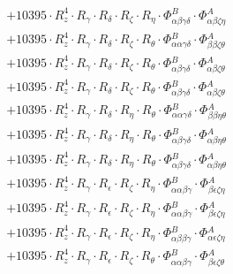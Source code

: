 \documentclass{article}
\begin{document}
\begin{subequations}
\begin{gather}
\begin{array}{c}
 \\[0.2em] 		 + 10395 \cdot R_{z}^{4} \cdot R_{\gamma{}} \cdot R_{\delta{}} \cdot R_{\zeta{}} \cdot R_{\eta{}} \cdot \Phi{}^{B}_{\alpha{}\beta{}\gamma{}\delta{}} \cdot \Phi{}^{A}_{\alpha{}\beta{}\zeta{}\eta{}} 
 \\[0.2em] 		 + 10395 \cdot R_{z}^{4} \cdot R_{\gamma{}} \cdot R_{\delta{}} \cdot R_{\zeta{}} \cdot R_{\theta{}} \cdot \Phi{}^{B}_{\alpha{}\alpha{}\gamma{}\delta{}} \cdot \Phi{}^{A}_{\beta{}\beta{}\zeta{}\theta{}} 
 \\[0.2em] 		 + 10395 \cdot R_{z}^{4} \cdot R_{\gamma{}} \cdot R_{\delta{}} \cdot R_{\zeta{}} \cdot R_{\theta{}} \cdot \Phi{}^{B}_{\alpha{}\beta{}\gamma{}\delta{}} \cdot \Phi{}^{A}_{\alpha{}\beta{}\zeta{}\theta{}} 
 \\[0.2em] 		 + 10395 \cdot R_{z}^{4} \cdot R_{\gamma{}} \cdot R_{\delta{}} \cdot R_{\zeta{}} \cdot R_{\theta{}} \cdot \Phi{}^{B}_{\alpha{}\beta{}\gamma{}\delta{}} \cdot \Phi{}^{A}_{\alpha{}\beta{}\zeta{}\theta{}} 
 \\[0.2em] 		 + 10395 \cdot R_{z}^{4} \cdot R_{\gamma{}} \cdot R_{\delta{}} \cdot R_{\eta{}} \cdot R_{\theta{}} \cdot \Phi{}^{B}_{\alpha{}\alpha{}\gamma{}\delta{}} \cdot \Phi{}^{A}_{\beta{}\beta{}\eta{}\theta{}} 
 \\[0.2em] 		 + 10395 \cdot R_{z}^{4} \cdot R_{\gamma{}} \cdot R_{\delta{}} \cdot R_{\eta{}} \cdot R_{\theta{}} \cdot \Phi{}^{B}_{\alpha{}\beta{}\gamma{}\delta{}} \cdot \Phi{}^{A}_{\alpha{}\beta{}\eta{}\theta{}} 
 \\[0.2em] 		 + 10395 \cdot R_{z}^{4} \cdot R_{\gamma{}} \cdot R_{\delta{}} \cdot R_{\eta{}} \cdot R_{\theta{}} \cdot \Phi{}^{B}_{\alpha{}\beta{}\gamma{}\delta{}} \cdot \Phi{}^{A}_{\alpha{}\beta{}\eta{}\theta{}} 
 \\[0.2em] 		 + 10395 \cdot R_{z}^{4} \cdot R_{\gamma{}} \cdot R_{\epsilon{}} \cdot R_{\zeta{}} \cdot R_{\eta{}} \cdot \Phi{}^{B}_{\alpha{}\alpha{}\beta{}\gamma{}} \cdot \Phi{}^{A}_{\beta{}\epsilon{}\zeta{}\eta{}} 
 \\[0.2em] 		 + 10395 \cdot R_{z}^{4} \cdot R_{\gamma{}} \cdot R_{\epsilon{}} \cdot R_{\zeta{}} \cdot R_{\eta{}} \cdot \Phi{}^{B}_{\alpha{}\alpha{}\beta{}\gamma{}} \cdot \Phi{}^{A}_{\beta{}\epsilon{}\zeta{}\eta{}} 
 \\[0.2em] 		 + 10395 \cdot R_{z}^{4} \cdot R_{\gamma{}} \cdot R_{\epsilon{}} \cdot R_{\zeta{}} \cdot R_{\eta{}} \cdot \Phi{}^{B}_{\alpha{}\beta{}\beta{}\gamma{}} \cdot \Phi{}^{A}_{\alpha{}\epsilon{}\zeta{}\eta{}} 
 \\[0.2em] 		 + 10395 \cdot R_{z}^{4} \cdot R_{\gamma{}} \cdot R_{\epsilon{}} \cdot R_{\zeta{}} \cdot R_{\theta{}} \cdot \Phi{}^{B}_{\alpha{}\alpha{}\beta{}\gamma{}} \cdot \Phi{}^{A}_{\beta{}\epsilon{}\zeta{}\theta{}} 

\end{array}
\end{gather}
\end{subequations}
\end{document}
